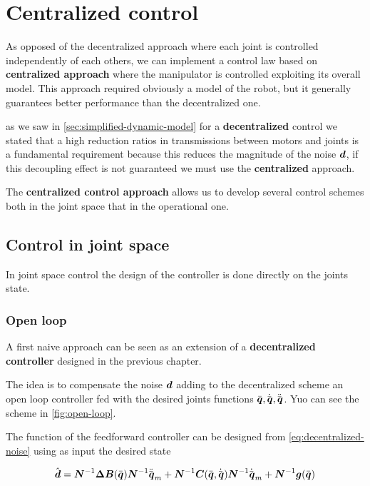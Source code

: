 \chapter{Centralized control}\label{ch:centralized-control}

As opposed of the decentralized approach where each joint is controlled independently of each others, we can implement a control law based on \textbf{centralized approach} where the manipulator is controlled exploiting its overall model.
This approach required obviously a model of the robot, but it generally guarantees better performance than the decentralized one.

\begin{nb}as we saw in \autoref{sec:simplified-dynamic-model} for a \textbf{decentralized} control we stated that a high reduction ratios in transmissions between motors and joints is a fundamental requirement because this reduces the magnitude of the noise $\boldsymbol{d}$, if this decoupling effect is not guaranteed we must use the \textbf{centralized} approach.\end{nb}

The \textbf{centralized control approach} allows us to develop several control schemes both in the joint space that in the operational one.

\section{Control in joint space}

In joint space control the design of the controller is done directly on the joints state.

\subsection{Open loop}

A first naive approach can be seen as an extension of a \textbf{decentralized controller} designed in the previous chapter.

The idea is to compensate the noise $\boldsymbol{d}$ adding to the decentralized scheme an open loop controller fed with the desired joints functions $\bar{\boldsymbol{q}}, \dot{\bar{\boldsymbol{q}}}, \ddot{\bar{\boldsymbol{q}}}$.
Yuo can see the scheme in \autoref{fig:open-loop}.

The function of the feedforward controller can be designed from \autoref{eq:decentralized-noise} using as input the desired state

\[
	\hat{\boldsymbol{d}} = \boldsymbol{N}^{-1} \boldsymbol{\Delta B}(\bar{\boldsymbol{q}}) \boldsymbol{N}^{-1} \ddot{\bar{\boldsymbol{q}}}_m +\boldsymbol{N}^{-1} \boldsymbol{C}(\bar{\boldsymbol{q}},\dot{\bar{\boldsymbol{q}}}) \boldsymbol{N}^{-1} \dot{\bar{\boldsymbol{q}}}_m + \boldsymbol{N}^{-1} \boldsymbol{g}(\bar{\boldsymbol{q}})
\]


